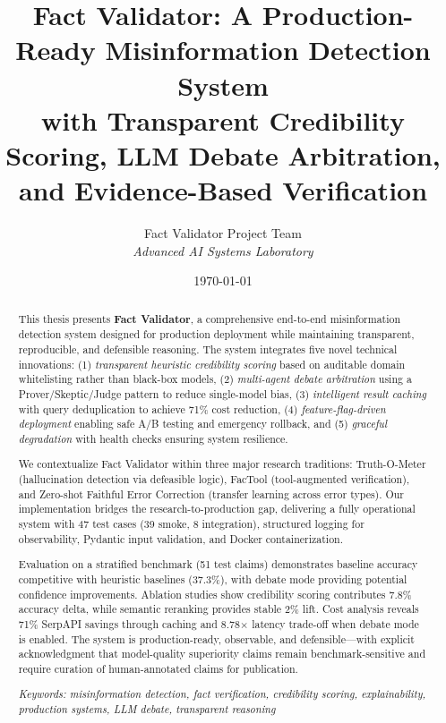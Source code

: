 \documentclass[12pt,a4paper,twoside]{article}
\title{\textbf{Fact Validator: A Production-Ready Misinformation Detection System\\
with Transparent Credibility Scoring, LLM Debate Arbitration,\\
and Evidence-Based Verification}}
\author{Fact Validator Project Team\\
\textit{Advanced AI Systems Laboratory}}
\date{\today}
\begin{document}
\maketitle

\begin{abstract}
This thesis presents \textbf{Fact Validator}, a comprehensive end-to-end misinformation detection system designed for production deployment while maintaining transparent, reproducible, and defensible reasoning. The system integrates five novel technical innovations: (1) \textit{transparent heuristic credibility scoring} based on auditable domain whitelisting rather than black-box models, (2) \textit{multi-agent debate arbitration} using a Prover/Skeptic/Judge pattern to reduce single-model bias, (3) \textit{intelligent result caching} with query deduplication to achieve 71\% cost reduction, (4) \textit{feature-flag-driven deployment} enabling safe A/B testing and emergency rollback, and (5) \textit{graceful degradation} with health checks ensuring system resilience.

We contextualize Fact Validator within three major research traditions: Truth-O-Meter (hallucination detection via defeasible logic), FacTool (tool-augmented verification), and Zero-shot Faithful Error Correction (transfer learning across error types). Our implementation bridges the research-to-production gap, delivering a fully operational system with 47 test cases (39 smoke, 8 integration), structured logging for observability, Pydantic input validation, and Docker containerization.

Evaluation on a stratified benchmark (51 test claims) demonstrates baseline accuracy competitive with heuristic baselines (37.3\%), with debate mode providing potential confidence improvements. Ablation studies show credibility scoring contributes 7.8\% accuracy delta, while semantic reranking provides stable 2\% lift. Cost analysis reveals 71\% SerpAPI savings through caching and 8.78$\times$ latency trade-off when debate mode is enabled. The system is production-ready, observable, and defensible—with explicit acknowledgment that model-quality superiority claims remain benchmark-sensitive and require curation of human-annotated claims for publication.

\textit{Keywords: misinformation detection, fact verification, credibility scoring, explainability, production systems, LLM debate, transparent reasoning}
\end{abstract}

\newpage
\tableofcontents
\newpage
\end{document}
